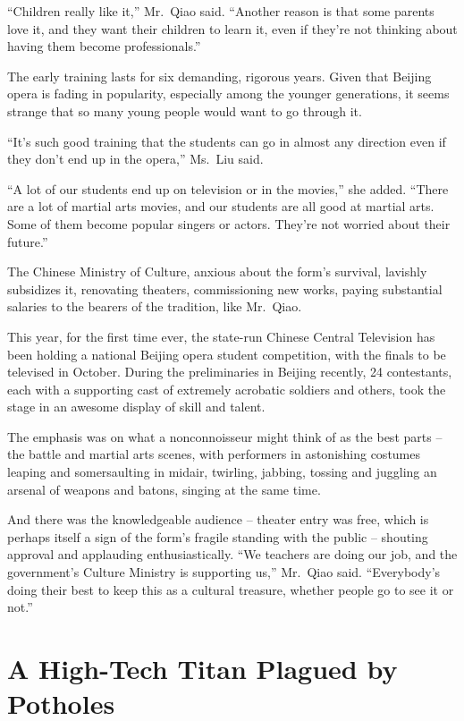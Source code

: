 ﻿\documentclass[12pt]{article}
\begin{document}
``Children really like it,'' Mr.~Qiao said. ``Another reason is that some parents love it, and they
want their children to learn it, even if they're not thinking about having them become
professionals.''

The early training lasts for six demanding, rigorous years. Given that Beijing opera is fading in
popularity, especially among the younger generations, it seems strange that so many young people
would want to go through it.

``It's such good training that the students can go in almost any direction even if they don't end up
in the opera,'' Ms.~Liu said.

``A lot of our students end up on television or in the movies,'' she added. ``There are a lot of
martial arts movies, and our students are all good at martial arts. Some of them become popular
singers or actors. They're not worried about their future.''

The Chinese Ministry of Culture, anxious about the form's survival, lavishly subsidizes it,
renovating theaters, commissioning new works, paying substantial salaries to the bearers of the
tradition, like Mr.~Qiao.

This year, for the first time ever, the state-run Chinese Central Television has been holding a
national Beijing opera student competition, with the finals to be televised in October. During the
preliminaries in Beijing recently, 24 contestants, each with a supporting cast of extremely
acrobatic soldiers and others, took the stage in an awesome display of skill and talent.

The emphasis was on what a nonconnoisseur might think of as the best parts -- the battle and martial
arts scenes, with performers in astonishing costumes leaping and somersaulting in midair, twirling,
jabbing, tossing and juggling an arsenal of weapons and batons, singing at the same time.

And there was the knowledgeable audience -- theater entry was free, which is perhaps itself a sign
of the form's fragile standing with the public -- shouting approval and applauding enthusiastically.
``We teachers are doing our job, and the government's Culture Ministry is supporting us,'' Mr.~Qiao
said. ``Everybody's doing their best to keep this as a cultural treasure, whether people go to see
it or not.''

\pagebreak
\section{A High-Tech Titan Plagued by Potholes}
\end{document}
